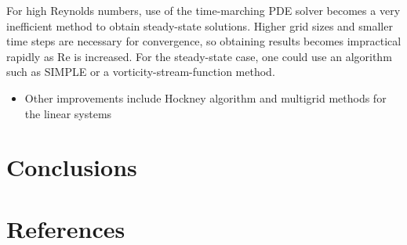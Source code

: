 \documentclass[final,3p,twocolumn]{elsarticle}
\begin{document}
For high Reynolds numbers, use of the time-marching PDE solver becomes a very
inefficient method to obtain steady-state solutions. Higher grid sizes and
smaller time steps are necessary for convergence, so obtaining results 
becomes impractical rapidly as Re is increased. For the steady-state case, one
could use an algorithm such as SIMPLE or a vorticity-stream-function method.

\begin{itemize}
    \item Other improvements include Hockney algorithm and multigrid methods
        for the linear systems
\end{itemize}

\section{Conclusions}
\label{sec:conclusion}


\section*{References}


\end{document}
